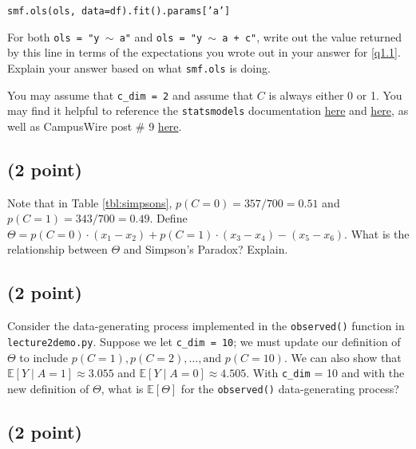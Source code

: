 \documentclass[12pt]{article}
\begin{document}
{\tt smf.ols(ols, data=df).fit().params['a']}

\noindent For both {\tt ols = "y $\sim$ a"} and {\tt ols = "y $\sim$ a + c"}, write out the value returned by this line in terms of the expectations you wrote out in your answer for \ref{q1.1}.
Explain your answer based on what {\tt smf.ols} is doing.

You may assume that {\tt c\_dim = 2} and assume that $C$ is always either 0 or 1. You may find it helpful to reference the {\tt statsmodels} documentation \href{https://www.statsmodels.org/dev/generated/statsmodels.regression.linear_model.OLS.html}{here} and \href{https://www.statsmodels.org/dev/generated/statsmodels.regression.linear_model.RegressionResults.html#statsmodels.regression.linear_model.RegressionResults}{here}, as well as CampusWire post \# 9 \href{https://campuswire.com/c/GACD83E19/feed/9}{here}.

\subsection{(2 point)} \label{q:theta_and_simpsons}

Note that in Table \ref{tbl:simpsons}, $p(C=0) = 357 / 700 = 0.51$ and $p(C=1) = 343 / 700 = 0.49$. Define $\Theta = p(C=0) \cdot (x_1 - x_2) + p(C=1) \cdot (x_3 - x_4) - (x_5 - x_6)$.
What is the relationship between $\Theta$ and Simpson's Paradox? Explain.

\vspace{3cm} %

\subsection{(2 point)}

Consider the data-generating process implemented in the {\tt observed()} function in {\tt lecture2demo.py}. 
Suppose we let {\tt c\_dim = 10}; we must update our definition of $\Theta$ to include $p(C=1), p(C=2), \ldots, \text{and } p(C=10)$. 
We can also show that $\mathbb{E}[Y \mid A=1] \approx 3.055$ and $\mathbb{E}[Y \mid A=0] \approx 4.505$. 
With {\tt c\_dim} = 10 and with the new definition of $\Theta$, what is $\mathbb{E}[\Theta]$ for the {\tt observed()} data-generating process?

\subsection{(2 point)}
\end{document}
